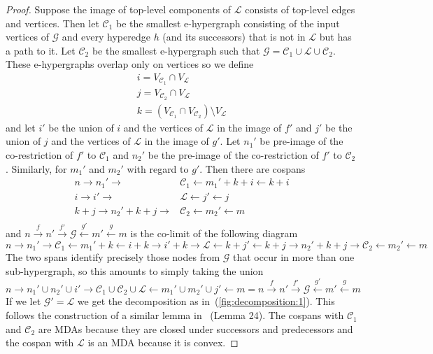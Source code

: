 \begin{proof}
    Suppose the image of top-level components of $\mathcal{L}$ consists of top-level edges and vertices.
    Then let $\mathcal{C}_1$ be the smallest e-hypergraph consisting of the input vertices of $\mathcal{G}$ and every hyperedge $h$ (and its successors) that is not in $\mathcal{L}$ but has a path to it.
    Let $\mathcal{C}_{2}$ be the smallest e-hypergraph such that $\mathcal{G} = \mathcal{C}_{1} \cup \mathcal{L} \cup \mathcal{C}_{2}$.
    These e-hypergraphs overlap only on vertices so we define
    \begin{align*}
        i = V_{\mathcal{C}_{1}} \cap V_{\mathcal{L}}\\
        j = V_{\mathcal{C}_{2}} \cap V_{\mathcal{L}}\\
        k = (V_{\mathcal{C}_{1}} \cap V_{\mathcal{C}_{2}}) \setminus V_{\mathcal{L}}
    \end{align*}
    and let $i'$ be the union of $i$ and the vertices of $\mathcal{L}$ in the image of $f'$ and $j'$ be the union of $j$ and the vertices of $\mathcal{L}$ in the image of $g'$.
    Let $n_{1}'$ be pre-image of the co-restriction of $f'$ to $\mathcal{C}_{1}$ and $n_{2}'$ be the pre-image of the co-restriction of $f'$ to $\mathcal{C}_{2}$.
    Similarly, for $m_{1}'$ and $m_{2}'$ with regard to $g'$.
    Then there are cospans
    \begin{align*}
        n \to n_{1}' \to &\mathcal{C}_{1} \xleftarrow{} m_{1}' + k + i \xleftarrow{} k + i\\
        i \to i' \to &\mathcal{L} \xleftarrow{} j' \xleftarrow{} j\\
        k + j \to n_{2}' + k + j \to &\mathcal{C}_{2} \xleftarrow{} m_{2}' \xleftarrow{} m\\
    \end{align*}
    and $n \xrightarrow{f} n' \xrightarrow{f'} \mathcal{G} \xleftarrow{g'} m' \xleftarrow{g} m$ is the co-limit of the following diagram
    \[
        n \to n_{1}' \to \mathcal{C}_{1} \xleftarrow{} m_{1}' + k \xleftarrow{} i + k \to i' + k \to \mathcal{L} \xleftarrow{} k + j' \xleftarrow{} k + j \xrightarrow{} n_{2}' + k + j \to \mathcal{C}_{2} \xleftarrow{} m_{2}' \xleftarrow{} m
    \]
    The two spans identify precisely those nodes from $\mathcal{G}$ that occur in more than one sub-hypergraph, so this amounts to simply taking the union
    \[
    n \to n_{1}' \cup n_{2}' \cup i' \to \mathcal{C}_{1} \cup \mathcal{C}_{2} \cup \mathcal{L} \xleftarrow{} m_{1}' \cup m_{2}' \cup j' \xleftarrow{} m  = n \xrightarrow{f} n' \xrightarrow{f'} \mathcal{G} \xleftarrow{g'} m' \xleftarrow{g} m
    \]
    If we let $\mathcal{G}' = \mathcal{L}$ we get the decomposition as in~(\ref{fig:decomposition:1}).
    This follows the construction of a similar lemma in~\cite{bonchi_string_2022-1} (Lemma 24). 
    The cospans with $\mathcal{C}_{1}$ and $\mathcal{C}_{2}$ are MDAs because they are closed under successors and predecessors and the cospan with $\mathcal{L}$ is an MDA because it is convex.



\end{proof}
